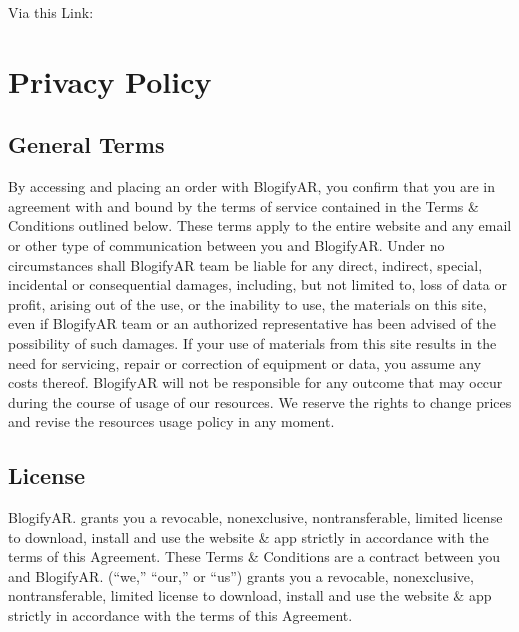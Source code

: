 \documentclass[letterpaper,11pt,openany,oneside,english,openany]{sphinxmanual}
\begin{document}
\sphinxAtStartPar
\sphinxhyphen{}Via this Link: 

\sphinxstepscope




\chapter{Privacy Policy}
\label{\detokenize{privacy_policy:privacy-policy}}\label{\detokenize{privacy_policy::doc}}

\section{\sphinxhyphen{}General Terms}
\label{\detokenize{privacy_policy:general-terms}}
\sphinxAtStartPar
By accessing and placing an order with BlogifyAR, you confirm that you are in agreement with and bound by the terms of
service contained in the Terms \& Conditions outlined below. These terms apply to the entire website and any email or other
type of communication between you and BlogifyAR.
Under no circumstances shall BlogifyAR team be liable for any direct, indirect, special, incidental or consequential damages,
including, but not limited to, loss of data or profit, arising out of the use, or the inability to use, the materials on this site, even
if BlogifyAR team or an authorized representative has been advised of the possibility of such damages. If your use of
materials from this site results in the need for servicing, repair or correction of equipment or data, you assume any costs
thereof.
BlogifyAR will not be responsible for any outcome that may occur during the course of usage of our resources. We reserve
the rights to change prices and revise the resources usage policy in any moment.


\section{\sphinxhyphen{}License}
\label{\detokenize{privacy_policy:license}}
\sphinxAtStartPar
BlogifyAR. grants you a revocable, non\sphinxhyphen{}exclusive, non\sphinxhyphen{}transferable, limited license to download, install and use the website
\& app strictly in accordance with the terms of this Agreement. These Terms \& Conditions are a contract between you and
BlogifyAR. (“we,” “our,” or “us”) grants you a revocable, non\sphinxhyphen{}exclusive, non\sphinxhyphen{}transferable, limited license to download, install
and use the website \& app strictly in accordance with the terms of this Agreement.
\end{document}
